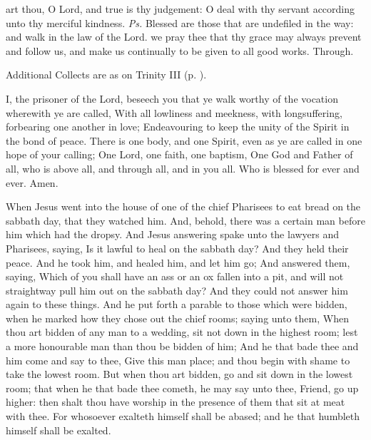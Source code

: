 
\introit
{} art thou, O Lord, and true is thy judgement: O deal with thy servant according unto thy merciful kindness. \textit{Ps.} Blessed are those that are undefiled in the way: and walk in the law of the Lord.
\collect
{} we pray thee that thy grace may always prevent and follow us, and make us continually to be given to all good works. Through.
\begin{rubric}
    Additional Collects are as on Trinity III (p. \pageref{TrinityIII}).
\end{rubric}

 I, the prisoner of the Lord, beseech you that ye walk worthy of the vocation wherewith ye are called, With all lowliness and meekness, with longsuffering, forbearing one another in love; Endeavouring to keep the unity of the Spirit in the bond of peace. There is one body, and one Spirit, even as ye are called in one hope of your calling; One Lord, one faith, one baptism, One God and Father of all, who is above all, and through all, and in you all. Who is blessed for ever and ever. Amen.

\vspace{-1ex}
 When Jesus went into the house of one of the chief Pharisees to eat bread on the sabbath day, that they watched him. And, behold, there was a certain man before him which had the dropsy. And Jesus answering spake unto the lawyers and Pharisees, saying, Is it lawful to heal on the sabbath day? And they held their peace. And he took him, and healed him, and let him go; And answered them, saying, Which of you shall have an ass or an ox fallen into a pit, and will not straightway pull him out on the sabbath day? And they could not answer him again to these things. And he put forth a parable to those which were bidden, when he marked how they chose out the chief rooms; saying unto them, When thou art bidden of any man to a wedding, sit not down in the highest room; lest a more honourable man than thou be bidden of him; And he that bade thee and him come and say to thee, Give this man place; and thou begin with shame to take the lowest room. But when thou art bidden, go and sit down in the lowest room; that when he that bade thee cometh, he may say unto thee, Friend, go up higher: then shalt thou have worship in the presence of them that sit at meat with thee. For whosoever exalteth himself shall be abased; and he that humbleth himself shall be exalted.


